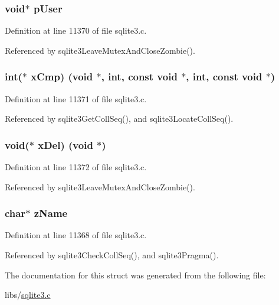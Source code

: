 \subsubsection[{p\+User}]{\setlength{\rightskip}{0pt plus 5cm}void$\ast$ p\+User}\label{struct_coll_seq_afcecb2add875c6162c0c6874d2c50faa}


Definition at line 11370 of file sqlite3.\+c.



Referenced by sqlite3\+Leave\+Mutex\+And\+Close\+Zombie().

\hypertarget{struct_coll_seq_ac2aa268873ec86c0965eee3dba777096}{}
\subsubsection[{x\+Cmp}]{\setlength{\rightskip}{0pt plus 5cm}int($\ast$ x\+Cmp) (void $\ast$, int, const void $\ast$, int, const void $\ast$)}\label{struct_coll_seq_ac2aa268873ec86c0965eee3dba777096}


Definition at line 11371 of file sqlite3.\+c.



Referenced by sqlite3\+Get\+Coll\+Seq(), and sqlite3\+Locate\+Coll\+Seq().

\hypertarget{struct_coll_seq_ad2185e5192b0df27c6a55ba9b65c94c2}{}
\subsubsection[{x\+Del}]{\setlength{\rightskip}{0pt plus 5cm}void($\ast$ x\+Del) (void $\ast$)}\label{struct_coll_seq_ad2185e5192b0df27c6a55ba9b65c94c2}


Definition at line 11372 of file sqlite3.\+c.



Referenced by sqlite3\+Leave\+Mutex\+And\+Close\+Zombie().

\hypertarget{struct_coll_seq_a661118d86ac4127d40bf3be78d92117d}{}
\subsubsection[{z\+Name}]{\setlength{\rightskip}{0pt plus 5cm}char$\ast$ z\+Name}\label{struct_coll_seq_a661118d86ac4127d40bf3be78d92117d}


Definition at line 11368 of file sqlite3.\+c.



Referenced by sqlite3\+Check\+Coll\+Seq(), and sqlite3\+Pragma().



The documentation for this struct was generated from the following file\+:\begin{DoxyCompactItemize}
\item 
libs/\hyperlink{sqlite3_8c}{sqlite3.\+c}\end{DoxyCompactItemize}
